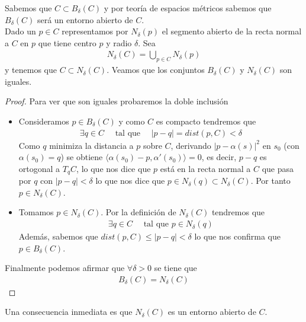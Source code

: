\begin{observacion}
    Sabemos que $C\subset B_\delta(C)$ y por teoría de espacios métricos sabemos que $B_\delta(C)$ será un entorno abierto de $C$.\\
    
    Dado un $p\in C$ representamos por $N_\delta(p)$ el segmento abierto de la recta normal a $C$ en $p$ que tiene centro $p$ y radio $\delta$. Sea 
    \begin{gather*}
        N_\delta(C) = \bigcup_{p\in C} N_\delta(p)
    \end{gather*}
    y tenemos que $C\subset N_\delta(C)$. Veamos que los conjuntos $B_\delta(C)$ y $N_\delta(C)$ son iguales.
    \begin{proof}
        Para ver que son iguales probaremos la doble inclusión
        \begin{itemize}
            \item[$\subseteq$ )] Consideramos $p\in B_\delta(C)$ y como $C$ es compacto tendremos que 
            \begin{gather*}
                \exists q \in C \quad \text{ tal que } \quad |p-q| = dist(p,C) < \delta
            \end{gather*}
            Como $q$ minimiza la distancia a $p$ sobre $C$, derivando $|p-\alpha(s)|^2$ en $s_0$ (con $\alpha(s_0)=q$) se obtiene $\langle \alpha(s_0)-p, \alpha'(s_0)\rangle = 0$, es decir, $p-q$ es ortogonal a $T_qC$, lo que nos dice que $p$ está en la recta normal a $C$ que pasa por $q$ con $|p-q| < \delta$ lo que nos dice que $p\in N_\delta(q)\subset N_\delta(C)$. Por tanto $p\in N_\delta(C)$.

            \item[$\supseteq$ )] Tomamos $p\in N_\delta(C)$. Por la definición de $N_\delta(C)$ tendremos que 
            \begin{gather*}
                \exists q \in C \quad \text{ tal que } p\in N_\delta(q)
            \end{gather*}
            Además, sabemos que $dist(p,C) \leq |p-q| < \delta$ lo que nos confirma que $p\in B_\delta(C)$.
        \end{itemize}
        Finalmente podemos afirmar que $\forall \delta > 0$ se tiene que 
        \begin{gather*}
            B_\delta(C) = N_\delta(C)
        \end{gather*}
    \end{proof}
    Una consecuencia inmediata es que $N_\delta(C)$ es un entorno abierto de $C$. 
\end{observacion}

